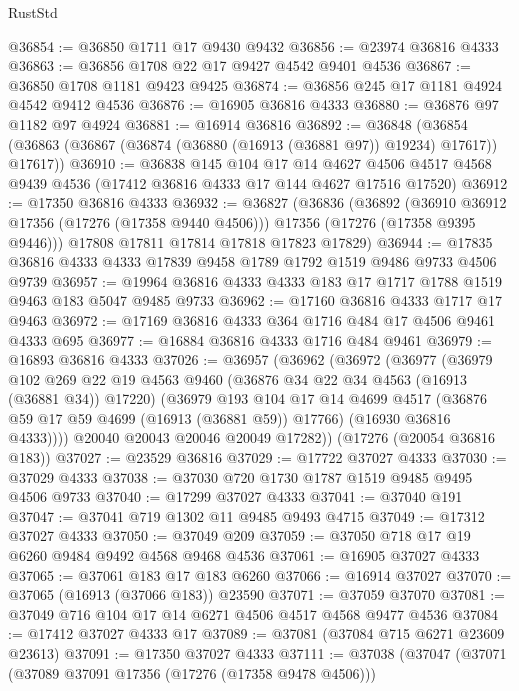 \begin{lexlean}{RustStd}
\begin{coremodule}
@36854 := @36850 @1711 @17 @9430 @9432
@36856 := @23974 @36816 @4333
@36863 := @36856 @1708 @22 @17 @9427 @4542 @9401 @4536
@36867 := @36850 @1708 @1181 @9423 @9425
@36874 := @36856 @245 @17 @1181 @4924 @4542 @9412 @4536
@36876 := @16905 @36816 @4333
@36880 := @36876 @97 @1182 @97 @4924
@36881 := @16914 @36816
@36892 := @36848
    (@36854 (@36863 (@36867 (@36874 (@36880 (@16913 (@36881 @97)) @19234) @17617)) @17617))
@36910 := @36838
    @145
    @104
    @17
    @14
    @4627
    @4506
    @4517
    @4568
    @9439
    @4536
    (@17412 @36816 @4333 @17 @144 @4627 @17516 @17520)
@36912 := @17350 @36816 @4333
@36932 := @36827
    (@36836
      (@36892
        (@36910 @36912 @17356 (@17276 (@17358 @9440 @4506)))
        @17356
        (@17276 (@17358 @9395 @9446)))
      @17808
      @17811
      @17814
      @17818
      @17823
      @17829)
@36944 := @17835 @36816 @4333 @4333 @17839 @9458 @1789 @1792 @1519 @9486 @9733 @4506 @9739
@36957 := @19964 @36816 @4333 @4333 @183 @17 @1717 @1788 @1519 @9463 @183 @5047 @9485 @9733
@36962 := @17160 @36816 @4333 @1717 @17 @9463
@36972 := @17169 @36816 @4333 @364 @1716 @484 @17 @4506 @9461 @4333 @695
@36977 := @16884 @36816 @4333 @1716 @484 @9461
@36979 := @16893 @36816 @4333
@37026 := @36957
    (@36962
      (@36972
        (@36977
          (@36979
            @102
            @269
            @22
            @19
            @4563
            @9460
            (@36876 @34 @22 @34 @4563 (@16913 (@36881 @34)) @17220)
            (@36979
              @193
              @104
              @17
              @14
              @4699
              @4517
              (@36876 @59 @17 @59 @4699 (@16913 (@36881 @59)) @17766)
              (@16930 @36816 @4333))))
        @20040
        @20043
        @20046
        @20049
        @17282))
    (@17276 (@20054 @36816 @183))
@37027 := @23529 @36816
@37029 := @17722 @37027 @4333
@37030 := @37029 @4333
@37038 := @37030 @720 @1730 @1787 @1519 @9485 @9495 @4506 @9733
@37040 := @17299 @37027 @4333
@37041 := @37040 @191
@37047 := @37041 @719 @1302 @11 @9485 @9493 @4715
@37049 := @17312 @37027 @4333
@37050 := @37049 @209
@37059 := @37050 @718 @17 @19 @6260 @9484 @9492 @4568 @9468 @4536
@37061 := @16905 @37027 @4333
@37065 := @37061 @183 @17 @183 @6260
@37066 := @16914 @37027
@37070 := @37065 (@16913 (@37066 @183)) @23590
@37071 := @37059 @37070
@37081 := @37049 @716 @104 @17 @14 @6271 @4506 @4517 @4568 @9477 @4536
@37084 := @17412 @37027 @4333 @17
@37089 := @37081 (@37084 @715 @6271 @23609 @23613)
@37091 := @17350 @37027 @4333
@37111 := @37038
    (@37047
      (@37071
        (@37089 @37091 @17356 (@17276 (@17358 @9478 @4506)))

\end{coremodule}
\end{lexlean}
